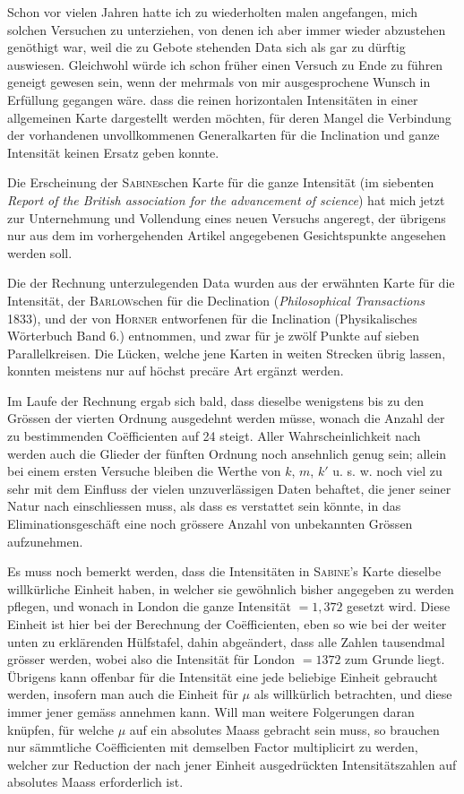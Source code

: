 Schon vor vielen Jahren hatte ich zu wiederholten malen angefangen, mich solchen Versuchen zu unterziehen, von denen ich aber immer wieder abzustehen genöthigt war, weil die zu Gebote stehenden Data sich als gar zu dürftig auswiesen. Gleichwohl würde ich schon früher einen Versuch zu Ende zu führen geneigt gewesen sein, wenn der mehrmals von mir ausgesprochene Wunsch in Erfüllung gegangen wäre. dass die reinen horizontalen Intensitäten in einer allgemeinen Karte dargestellt werden möchten, für deren Mangel die Verbindung der vorhandenen unvollkommenen Generalkarten für die Inclination und ganze Intensität keinen Ersatz geben konnte.

Die Erscheinung der \textsc{Sabine}schen Karte für die ganze Intensität (im siebenten \textit{Report of the British association for the advancement of science}) hat mich jetzt zur Unternehmung und Vollendung eines neuen Versuchs angeregt, der übrigens nur aus dem im vorhergehenden Artikel angegebenen Gesichtspunkte angesehen werden soll.

Die der Rechnung unterzulegenden Data wurden aus der erwähnten Karte für die Intensität, der \textsc{Barlow}schen für die Declination (\textit{Philosophical Transactions} 1833), und der von \textsc{Horner} entworfenen für die Inclination (Physikalisches Wörterbuch Band 6.) entnommen, und zwar für je zwölf Punkte auf sieben Parallelkreisen. Die Lücken, welche jene Karten in weiten Strecken übrig lassen, konnten meistens nur auf höchst precäre Art ergänzt werden.

Im Laufe der Rechnung ergab sich bald, dass dieselbe wenigstens bis zu den Grössen der vierten Ordnung ausgedehnt werden müsse, wonach die Anzahl der zu bestimmenden Coëfficienten auf 24 steigt. Aller Wahrscheinlichkeit nach werden auch die Glieder der fünften Ordnung noch ansehnlich genug sein; allein bei einem ersten Versuche bleiben die Werthe von $k$, $m$, $k'$ u. s. w. noch viel zu sehr mit dem Einfluss der vielen unzuverlässigen Daten behaftet, die jener seiner Natur nach einschliessen muss, als dass es verstattet sein könnte, in das Eliminationsgeschäft eine noch grössere Anzahl von unbekannten Grössen aufzunehmen.

\par\clearpage
{}
Es muss noch bemerkt werden, dass die Intensitäten in \textsc{Sabine}'s Karte dieselbe willkürliche Einheit haben, in welcher sie gewöhnlich bisher ange\-geben zu werden pflegen, und wonach in London die ganze Intensität $=1{,}372$ gesetzt wird. Diese Einheit ist hier bei der Berechnung der Coëfficienten, eben so wie bei der weiter unten zu erklärenden Hülfstafel, dahin abgeändert, dass alle Zahlen tausendmal grösser werden, wobei also die Intensität für London $=1372$ zum Grunde liegt. Übrigens kann offenbar für die Intensität eine jede beliebige Einheit gebraucht werden, insofern man auch die Einheit für $\mu$ als willkürlich betrachten, und diese immer jener gemäss annehmen kann. Will man weitere Folgerungen daran knüpfen, für welche $\mu$ auf ein absolutes Maass gebracht sein muss, so brauchen nur sämmtliche Coëfficienten mit demselben Factor multiplicirt zu werden, welcher zur Reduction der nach jener Einheit ausgedrückten Intensitätszahlen auf absolutes Maass erforderlich ist.


